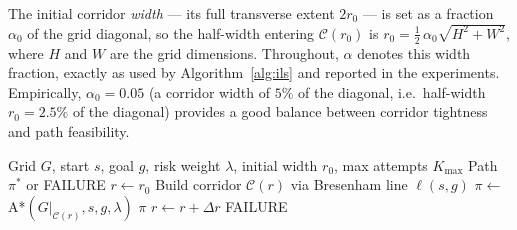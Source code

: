 \documentclass[preprint,12pt,authoryear]{elsarticle}
\begin{document}
The initial corridor \emph{width} --- its full transverse extent $2r_0$ --- is set as a fraction $\alpha_0$ of the grid diagonal, so the half-width entering $\mathcal{C}(r_0)$ is $r_0 = \tfrac{1}{2}\,\alpha_0 \sqrt{H^2 + W^2}$, where $H$ and $W$ are the grid dimensions. Throughout, $\alpha$ denotes this width fraction, exactly as used by Algorithm~\ref{alg:ils} and reported in the experiments.
Empirically, $\alpha_0 = 0.05$ (a corridor width of $5\%$ of the diagonal, i.e.\ half-width $r_0 = 2.5\%$ of the diagonal) provides a good balance between corridor tightness and path feasibility.

\begin{algorithm}[!htbp]
\caption{ILS: Incremental Line Search on Risk-Weighted Grid}
\label{alg:ils}
\begin{algorithmic}[1]
\REQUIRE Grid $G$, start $s$, goal $g$, risk weight $\lambda$, initial width $r_0$, max attempts $K_{\max}$
\ENSURE Path $\pi^*$ or FAILURE
\STATE $r \leftarrow r_0$
    \STATE Build corridor $\mathcal{C}(r)$ via Bresenham line $\ell(s, g)$
    \STATE $\pi \leftarrow$ A*$(G|_{\mathcal{C}(r)}, s, g, \lambda)$ 
        \RETURN $\pi$
    \ENDIF
    \STATE $r \leftarrow r + \Delta r$ 
\ENDFOR
\RETURN FAILURE
\end{algorithmic}
\end{algorithm}
\end{document}
